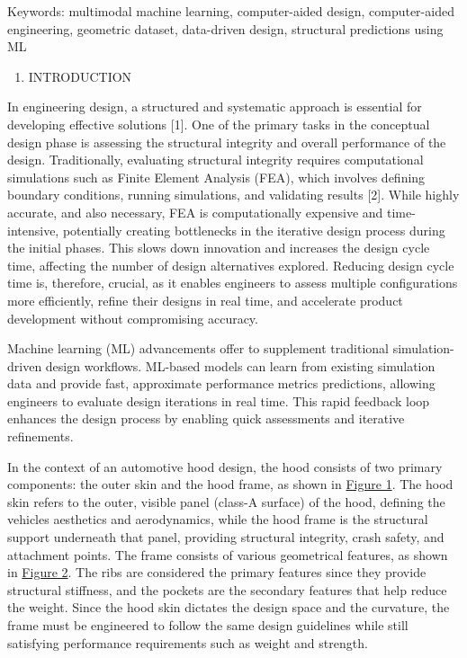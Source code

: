 \documentclass[11pt]{article}
\begin{document}
Keywords: multimodal machine learning, computer-aided design,
computer-aided engineering, geometric dataset, data-driven design,
structural predictions using ML

\begin{enumerate}
\def\labelenumi{\arabic{enumi}.}
\item
  INTRODUCTION
\end{enumerate}

In engineering design, a structured and systematic approach is essential
for developing effective solutions {[}1{]}. One of the primary tasks in
the conceptual design phase is assessing the structural integrity and
overall performance of the design. Traditionally, evaluating structural
integrity requires computational simulations such as Finite Element
Analysis (FEA), which involves defining boundary conditions, running
simulations, and validating results {[}2{]}. While highly accurate, and
also necessary, FEA is computationally expensive and time-intensive,
potentially creating bottlenecks in the iterative design process during
the initial phases. This slows down innovation and increases the design
cycle time, affecting the number of design alternatives explored.
Reducing design cycle time is, therefore, crucial, as it enables
engineers to assess multiple configurations more efficiently, refine
their designs in real time, and accelerate product development without
compromising accuracy.

Machine learning (ML) advancements offer to supplement traditional
simulation-driven design workflows. ML-based models can learn from
existing simulation data and provide fast, approximate performance
metrics predictions, allowing engineers to evaluate design iterations in
real time. This rapid feedback loop enhances the design process by
enabling quick assessments and iterative refinements.

In the context of an automotive hood design, the hood consists of two
primary components: the outer skin and the hood frame, as shown in
\hyperref[_Ref193023952]{Figure 1}. The hood skin refers to the outer,
visible panel (class-A surface) of the hood, defining the
vehicle\textquotesingle s aesthetics and aerodynamics, while the hood
frame is the structural support underneath that panel, providing
structural integrity, crash safety, and attachment points. The frame
consists of various geometrical features, as shown in
\hyperref[_Ref193044630]{Figure 2}. The ribs are considered the primary
features since they provide structural stiffness, and the pockets are
the secondary features that help reduce the weight. Since the hood skin
dictates the design space and the curvature, the frame must be
engineered to follow the same design guidelines while still satisfying
performance requirements such as weight and strength.
\end{document}
